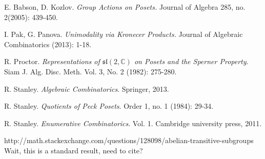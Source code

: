 \documentclass{amsart}
\theoremstyle{remark}
\begin{document}
\begin{thebibliography}{9}

  E. Babson, D. Kozlov. \emph{Group Actions on Posets.} Journal of Algebra 285, no. 2(2005): 439-450.
  
  I. Pak, G. Panova. \emph{Unimodality via Kronecer Products.} Journal of Algebraic Combinatorics (2013): 1-18.

  R. Proctor. \emph{Representations of $\mathfrak s \mathfrak l(2,\mathbb C)$ on Posets and the Sperner Property}. Siam J. Alg. Disc. Meth. Vol. 3, No. 2 (1982): 275-280.
  
  R. Stanley. \emph{Algebraic Combinatorics}. Springer, 2013.
  
  R. Stanley. \emph{Quotients of Peck Posets}.  Order 1, no. 1 (1984): 29-34.
    
  R. Stanley. \emph{Enumerative Combinatorics}. Vol. 1. Cambridge university press, 2011.

  http://math.stackexchange.com/questions/128098/abelian-transitive-subgroups Wait, this is a standard result, need to cite? 

\end{thebibliography}
\end{document}
